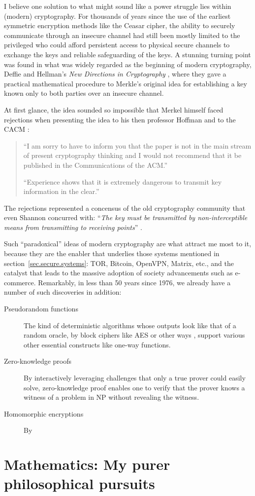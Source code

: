 \documentclass{article}
\begin{document}
I believe one solution to what might sound like a power struggle lies within
(modern) cryptography. For thousands of years since the use of the earliest
symmetric encryption methods like the Ceasar cipher, the ability to securely
communicate through an insecure channel had still been mostly limited to the
privileged who could afford persistent access to physical secure channels to
exchange the keys and reliable safeguarding of the keys.  A stunning turning
point was found in what was widely regarded as the beginning of modern
cryptography, Deffie and Hellman's \emph{New Directions in Cryptography}
\cite{new.directions.crypto}, where they gave a practical mathematical
procedure to Merkle's original idea for establishing a key known only to both
parties over an insecure channel.

At first glance, the idea sounded so impossible that Merkel himself faced 
rejections when presenting the idea to his then professor Hoffman and to the
CACM \cite{merkle.rejection}:
\begin{quotation}
	``I am sorry to have to inform you that the paper is not in the main stream
	of present cryptography thinking and I would not recommend that it be
	published in the Communications of the ACM.''

	``Experience shows that it is extremely dangerous to transmit key
	information in the clear.''\cite{merkle.rejection}
\end{quotation}
The rejections represented a concensus of the old cryptography community that
even Shannon concurred with: ``\emph{The key must be transmitted by
non-interceptible means from transmitting to receiving points}''
\cite[p.~670]{shannon.theory.secrecy}.

Such ``paradoxical'' ideas of modern cryptography are what attract me most to
it, because they are the enabler that underlies those systems mentioned in
section~\ref{sec.secure.systems}: TOR, Bitcoin, OpenVPN, Matrix, etc., and the
catalyst that leads to the massive adoption of society advancements such as
e-commerce. Remarkably, in less than 50 years since 1976, we already have a
number of such discoveries in addition:
\begin{description}
\item[Pseudorandom functions] The kind of deterministic algorithms
	whose outputs look like that of a random oracle, by block ciphers like
	AES\cite{aes} or other ways \cite{pseudo.rand.cons.2}, support various
	other essential constructs like one-way functions.

\item[Zero-knowledge proofs] By interactively leveraging challenges that only a
	true prover could easily solve, zero-knowledge proof \cite{zero.knowledge}
	enables one to verify that the prover knows a witness of a problem in NP
	\cite{zero.knowledge.np} without revealing the witness.

\item[Homomorphic encryptions] By 
\end{description}

\section{Mathematics: My purer philosophical pursuits}



\end{document}
